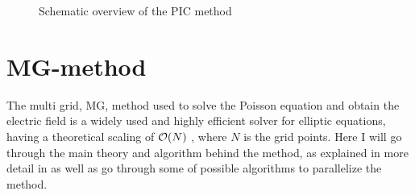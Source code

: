 \begin{figure}
\begin{tikzpicture}





		\end{tikzpicture}
		\caption{Schematic overview of the PIC method}
		\label{fig:schematic}
	\end{figure}


	\section{MG-method}
		The multi grid, MG, method used to solve the Poisson equation and obtain the electric field is a widely used and highly efficient solver for elliptic equations, having a theoretical scaling of \(\order{N}\) \citep{Press1987}, where \(N\) is the grid points. Here I will go through the main theory and algorithm behind the method, as explained in more detail in \citep{Press1987,Trottenberg2000} as well as go through some of possible algorithms to parallelize the method.

		